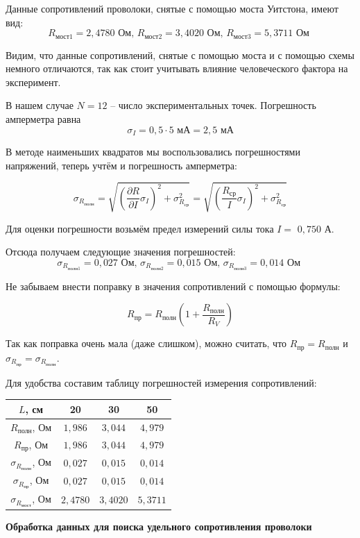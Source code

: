 Данные сопротивлений проволоки, снятые с помощью моста Уитстона, имеют вид:
\[R_{\text{мост}1} = 2,4780 \text{ Ом, }R_{\text{мост}2} = 3,4020\text{ Ом, }R_{\text{мост}3} = 5,3711\text{ Ом }\]

Видим, что данные сопротивлений, снятые с помощью моста и с помощью схемы немного отличаются, так как стоит учитывать влияние человеческого фактора на эксперимент.

В нашем случае $N = 12$ -- число экспериментальных точек. Погрешность амперметра равна
\[\sigma_I = 0,5 \cdot 5 \text{ мА} = 2,5 \text{ мА}\]

В методе наименьших квадратов мы воспользовались погрешностями напряжений, теперь учтём и погрешность амперметра:

\[\sigma_{R_{\text{полн}}} = \sqrt{ \left(\frac{\partial R}{\partial I} \sigma_I\right)^2 + \sigma_{R_{\text{ср}}}^2} = \sqrt{ \left(\frac{R_{\text{ср}}}{I} \sigma_I\right)^2 + \sigma_{R_{\text{ср}}}^2}\]

Для оценки погрешности возьмём предел измерений силы тока $I =$ $0,750$ А.

Отсюда получаем следующие значения погрешностей:
\[\sigma_{R_{\text{полн}1}} = 0,027 \text{ Ом, }\sigma_{R_{\text{полн}2}} = 0,015\text{ Ом, }\sigma_{R_{\text{полн}3}} = 0,014\text{ Ом }\]

Не забываем внести поправку в значения сопротивлений с помощью формулы:

\[R_{\text{пр}} = R_{\text{полн}} (1 + \frac{R_{\text{полн}}}{R_V})\]

Так как поправка очень мала (даже слишком), можно считать, что $R_{\text{пр}} = R_{\text{полн}}$ и $\sigma_{R_{\text{пр}}} = \sigma_{R_{\text{полн}}}$.

Для удобства составим таблицу погрешностей измерения сопротивлений:
\begin{center}
\begin{tabular}{|c|c|c|c|}
\hline 
$L$, см & 20 & 30 & 50 \\ 
\hline 
$R_{\text{полн}}$, Ом & $1,986$ & $3,044$ & $4,979$ \\ 
\hline 
$R_{\text{пр}}$, Ом & $1,986$ & $3,044$ & $4,979$ \\ 
\hline 
$\sigma_{R_{\text{полн}}}$, Ом & $0,027$ & $0,015$ & $0,014$ \\ 
\hline 
$\sigma_{R_{\text{пр}}}$, Ом & $0,027$ & $0,015$ & $0,014$ \\ 
\hline 
$\sigma_{R_{\text{мост}}}$, Ом & $2,4780$ & $3,4020$ & $5,3711$ \\ 
\hline  
\end{tabular} 
\end{center}
\newpage
\begin{center}
 \textbf{Обработка данных для поиска удельного сопротивления проволоки}
\end{center}

